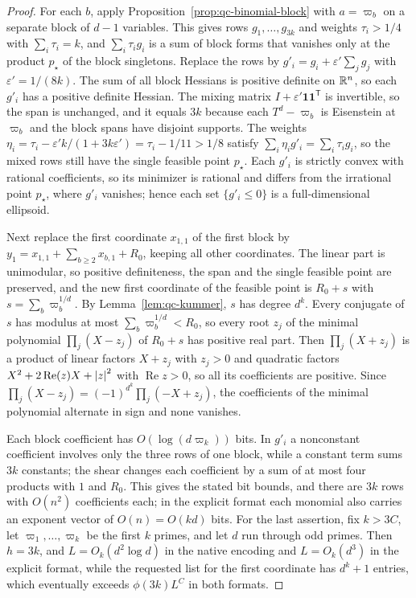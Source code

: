 \begin{proof}
For each $b$, apply Proposition~\ref{prop:qc-binomial-block} with $a=\varpi_b$
on a separate block of $d-1$ variables. This gives rows
$g_1,\ldots,g_{3k}$ and weights $\tau_i>1/4$ with $\sum_i\tau_i=k$, and
$\sum_i\tau_ig_i$ is a sum of block forms that vanishes only at the product
$p_\star$ of the block singletons. Replace the rows by
$g'_i=g_i+\varepsilon'\sum_jg_j$ with $\varepsilon'=1/(8k)$. The sum of all
block Hessians is positive definite on $\mathbb R^n$, so each $g'_i$ has a positive
definite Hessian. The mixing matrix $I+\varepsilon'\mathbf1\mathbf1^{\mathsf
T}$ is invertible, so the span is unchanged, and it equals $3k$ because each
$T^d-\varpi_b$ is Eisenstein at $\varpi_b$ and the block spans have disjoint
supports. The weights $\eta_i=\tau_i-\varepsilon'k/(1+3k\varepsilon')=
\tau_i-1/11>1/8$ satisfy $\sum_i\eta_ig'_i=\sum_i\tau_ig_i$, so the mixed rows
still have the single feasible point $p_\star$. Each $g'_i$ is strictly convex
with rational coefficients, so its minimizer is rational and differs from the
irrational point $p_\star$, where $g'_i$ vanishes; hence each set
$\{g'_i\le0\}$ is a full-dimensional ellipsoid.

Next replace the first coordinate $x_{1,1}$ of the first block by
$y_1=x_{1,1}+\sum_{b\ge2}x_{b,1}+R_0$, keeping all other coordinates. The
linear part is unimodular, so positive definiteness, the span and the single
feasible point are preserved, and the new first coordinate of the feasible
point is $R_0+s$ with $s=\sum_b\varpi_b^{1/d}$. By Lemma~\ref{lem:qc-kummer},
$s$ has degree $d^k$. Every conjugate of $s$ has modulus at most
$\sum_b\varpi_b^{1/d}<R_0$, so every root $z_j$ of the minimal polynomial
$\prod_j(X-z_j)$ of $R_0+s$ has positive real part. Then
$\prod_j(X+z_j)$ is a product of linear factors $X+z_j$ with $z_j>0$ and
quadratic factors $X^2+2\operatorname{Re}(z)X+\left\lvert z\right\rvert^2$ with
$\operatorname{Re}z>0$, so all its coefficients are positive. Since
$\prod_j(X-z_j)=(-1)^{d^k}\prod_j(-X+z_j)$, the coefficients of the minimal
polynomial alternate in sign and none vanishes.

Each block coefficient has $O(\log(d\varpi_k))$ bits. In $g'_i$ a nonconstant
coefficient involves only the three rows of one block, while a constant term
sums $3k$ constants; the shear changes each coefficient by a sum of at most
four products with $1$ and $R_0$. This gives the stated bit bounds, and there
are $3k$ rows with $O(n^2)$ coefficients each; in the explicit format each
monomial also carries an exponent vector of $O(n)=O(kd)$ bits. For the last
assertion, fix $k>3C$, let $\varpi_1,\ldots,\varpi_k$ be the first $k$ primes,
and let $d$ run through odd primes. Then $h=3k$, and $L=O_k(d^2\log d)$ in
the native encoding and $L=O_k(d^3)$ in the explicit format, while the
requested list for the first coordinate has $d^k+1$ entries, which eventually
exceeds $\phi(3k)L^C$ in both formats.
\end{proof}

